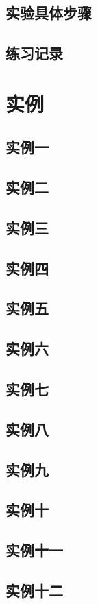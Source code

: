 \documentclass[a4paper]{article}
\begin{document}
\subsection{实验具体步骤}
\subsection{练习记录}
\section{实例}
\subsection{实例一}
\subsection{实例二}
\subsection{实例三}
\subsection{实例四}
\subsection{实例五}
\subsection{实例六}
\subsection{实例七}
\subsection{实例八}
\subsection{实例九}
\subsection{实例十}
\subsection{实例十一}
\subsection{实例十二}
\end{document}
